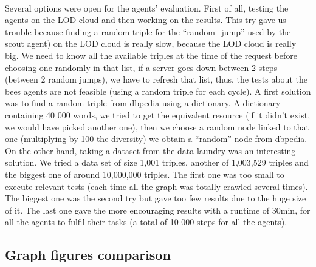\documentclass{article}
\begin{document}
		\paragraph{}
			Several options were open for the agents' evaluation.
			First of all, testing the agents on the LOD cloud and then working on the results.
			This try gave us trouble because finding a random triple for the ``random\_jump'' used by the scout agent)
			on the LOD cloud is really slow, because the LOD cloud is really big.
			We need to know all the available triples at the time of the request before choosing one randomly in that list,
			if a server goes down between 2 steps (between 2 random jumps), we have to refresh that list,
			thus, the tests about the bees agents are not feasible (using a random triple for each cycle).
			A first solution was to find a random triple from dbpedia using a dictionary.
			A dictionary containing 40 000 words, we tried to get the equivalent resource
			(if it didn't exist, we would have picked another one),
			then we choose a random node linked to that one (multiplying by 100 the diversity) we obtain a ``random'' node from dbpedia.
			On the other hand, taking a dataset from the data laundry was an interesting solution.
			We tried a data set of size 1,001 triples, another of 1,003,529 triples and the biggest one of around 10,000,000 triples.
			The first one was too small to execute relevant tests (each time all the graph was totally crawled several times).
			The biggest one was the second try but gave too few results due to the huge size of it.
			The last one gave the more encouraging results with a runtime of 30min, for all the agents to fulfil their tasks
			(a total of 10 000 steps for all the agents).
	\subsection{Graph figures comparison}
\end{document}
